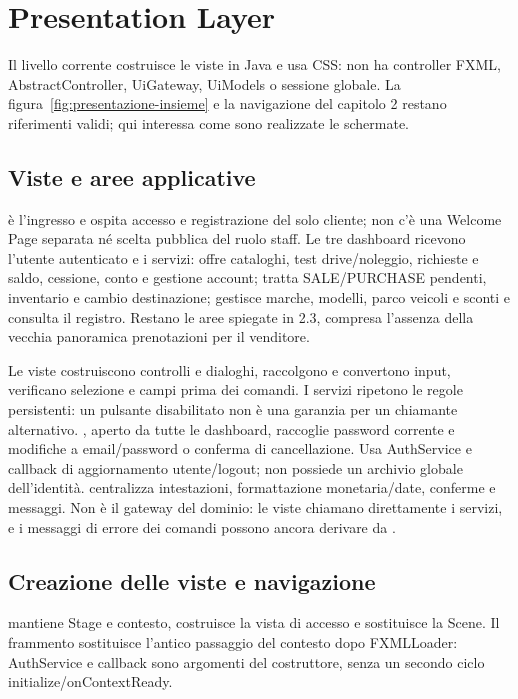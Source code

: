 \section{Presentation Layer}\label{sec:impl-presentazione}
Il livello corrente costruisce le viste in Java e usa CSS: non ha
controller FXML, AbstractController, UiGateway, UiModels o sessione globale.
La figura~\ref{fig:presentazione-insieme} e la navigazione del capitolo 2
restano riferimenti validi; qui interessa come sono realizzate le schermate.

\subsection{Viste e aree applicative}
 è l'ingresso e ospita accesso e registrazione del solo
cliente; non c'è una Welcome Page separata né scelta pubblica del ruolo
staff. Le tre dashboard ricevono l'utente autenticato e i servizi:
 offre cataloghi, test drive/noleggio, richieste
e saldo, cessione, conto e gestione account; 
tratta SALE/PURCHASE pendenti, inventario e cambio destinazione;
 gestisce marche, modelli, parco veicoli e
sconti e consulta il registro. Restano le aree spiegate in 2.3, compresa
l'assenza della vecchia panoramica prenotazioni per il venditore.

Le viste costruiscono controlli e dialoghi, raccolgono e convertono input,
verificano selezione e campi prima dei comandi. I servizi ripetono le
regole persistenti: un pulsante disabilitato non è una garanzia per un
chiamante alternativo. , aperto da tutte
le dashboard, raccoglie password corrente e modifiche a email/password
o conferma di cancellazione. Usa AuthService e callback di aggiornamento
utente/logout; non possiede un archivio globale dell'identità.
 centralizza intestazioni, formattazione monetaria/date,
conferme e messaggi. Non è il gateway del dominio: le viste chiamano
direttamente i servizi, e i messaggi di errore dei comandi possono ancora
derivare da .

\subsection{Creazione delle viste e navigazione}
 mantiene Stage e contesto, costruisce la vista di accesso e
sostituisce la Scene. Il frammento sostituisce l'antico passaggio del
contesto dopo FXMLLoader: AuthService e callback sono argomenti del
costruttore, senza un secondo ciclo initialize/onContextReady.

